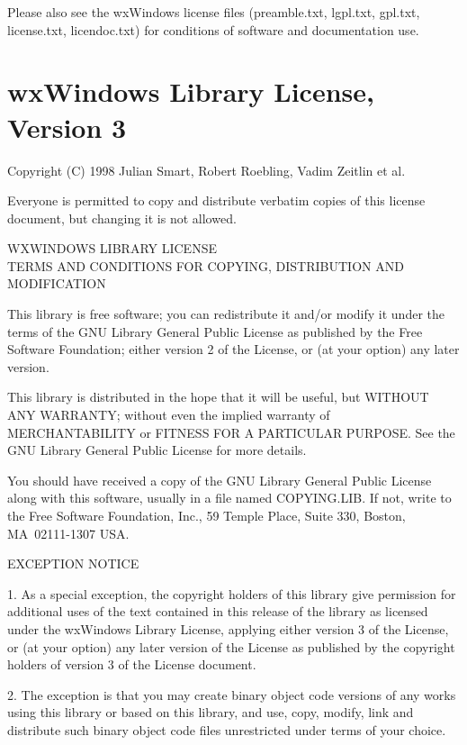 Please also see the wxWindows license files (preamble.txt, lgpl.txt, gpl.txt, license.txt,
licendoc.txt) for conditions of software and documentation use.

\section*{wxWindows Library License, Version 3}

Copyright (C) 1998 Julian Smart, Robert Roebling, Vadim Zeitlin et al. 

Everyone is permitted to copy and distribute verbatim copies
of this license document, but changing it is not allowed. 

\begin{center}
WXWINDOWS LIBRARY LICENSE\\
TERMS AND CONDITIONS FOR COPYING, DISTRIBUTION AND MODIFICATION 
\end{center}

This library is free software; you can redistribute it and/or modify it 
under the terms of the GNU Library General Public License as published by 
the Free Software Foundation; either version 2 of the License, or (at 
your option) any later version. 

This library is distributed in the hope that it will be useful, but 
WITHOUT ANY WARRANTY; without even the implied warranty of 
MERCHANTABILITY or FITNESS FOR A PARTICULAR PURPOSE. See the GNU Library 
General Public License for more details. 

You should have received a copy of the GNU Library General Public License 
along with this software, usually in a file named COPYING.LIB. If not, 
write to the Free Software Foundation, Inc., 59 Temple Place, Suite 330,
Boston, MA~02111-1307 USA. 

EXCEPTION NOTICE 

1. As a special exception, the copyright holders of this library give 
permission for additional uses of the text contained in this release of 
the library as licensed under the wxWindows Library License, applying 
either version 3 of the License, or (at your option) any later version of 
the License as published by the copyright holders of version 3 of the 
License document. 

2. The exception is that you may create binary object code versions of any 
works using this library or based on this library, and use, copy, modify, 
link and distribute such binary object code files unrestricted under terms 
of your choice. 

